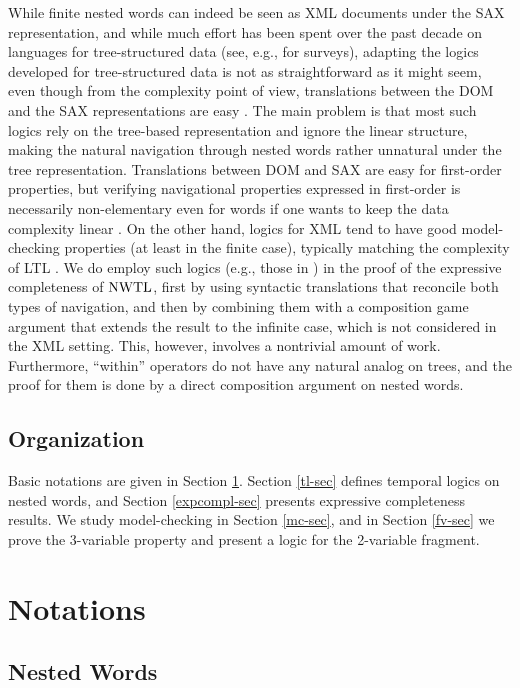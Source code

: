 \documentclass{LMCS}
\theoremstyle{plain}
\theoremstyle{definition}
\begin{document}
While finite nested words can indeed be seen as XML documents under
the SAX representation, and while much effort has been spent over the
past decade on languages for tree-structured data (see,
e.g., \cite{KSS03,Lib05,vianu-pods} for surveys), adapting the logics
developed for tree-structured data is not as straightforward as it
might seem, even though from the complexity point of view,
translations between the DOM and the SAX representations are easy
\cite{luc-pods03}.  The main problem is that most such logics rely on
the tree-based representation and ignore the linear structure, making
the natural navigation through nested words rather unnatural under the
tree representation. Translations between DOM and SAX are easy for
first-order properties, but verifying navigational properties
expressed in first-order is necessarily non-elementary even for words
if one wants to keep the data complexity linear \cite{FG02}.  On the
other hand, logics for XML tend to have good model-checking properties
(at least in the finite case), typically matching the complexity of
LTL \cite{GK-jacm,neven00}.  We do employ such logics (e.g., those in
\cite{marx-pods04,marx-tods,Schl92}) in the proof of the expressive
completeness of $\text{\rm NWTL}$, first by using syntactic translations that
reconcile both types of navigation, and then by combining them with a
composition game argument that extends the result to the infinite
case, which is not considered in the XML setting. This, however,
involves a nontrivial amount of work. Furthermore, ``within''
operators do not have any natural analog on trees, and the proof for
them is done by a direct composition argument on nested words.


\subsection*{Organization}
Basic notations are given in Section \ref{notations-sec}. Section
\ref{tl-sec} defines temporal logics on nested words, and Section
\ref{expcompl-sec} presents expressive completeness results. We study
model-checking in Section \ref{mc-sec}, and in Section \ref{fv-sec} we
prove the 3-variable property and present a logic for the 2-variable
fragment. 


\section{Notations} 
\label{notations-sec}

\subsection{Nested Words}
\end{document}
